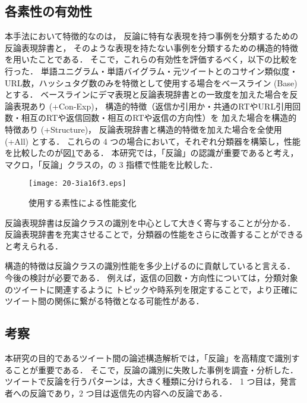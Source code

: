 \documentclass[japanese]{jnlp_1.4}
\newcommand{\addspan}[1]{}
\begin{document}
\subsection{各素性の有効性}

本手法において特徴的なのは，
反論に特有な表現を持つ事例を分類するための反論表現辞書と，
そのような表現を持たない事例を分類するための構造的特徴を用いたことである．
そこで，これらの有効性を評価するべく，以下の比較を行った．
単語ユニグラム・単語バイグラム・元ツイートとのコサイン類似度・
URL数，ハッシュタグ数のみを特徴として使用する場合をベースライン (Base) とする．
ベースラインにデマ表現と反論表現辞書との一致度を加えた場合を反論表現あり (+Con-Exp)，
構造的特徴（返信か引用か・共通のRTやURL引用回数・相互のRTや返信回数・相互のRTや返信の方向性）を
加えた場合を構造的特徴あり (+Structure)，
反論表現辞書と構造的特徴を加えた場合を全使用 (+All) とする．
これらの 4 つの場合において，それぞれ分類器を構築し，性能を比較したのが図\ref{fig:使用する素性による性能変化}である．
本研究では，「反論」の認識が重要であると考え，
マクロ\addspan{$F_1$値}，「反論」クラスの\addspan{$F_1$値}，\addspan{正答率}の 3 指標で性能を比較した．

\begin{figure}[b]
  \begin{center}
   \texttt{[image: 20-3ia16f3.eps]}
  \end{center}
  \caption{使用する素性による性能変化}
  \label{fig:使用する素性による性能変化}
\end{figure}

\addspan{まず，Baseに対する+Con-Exp，および+Structureに対する+Allの性能から，}
反論表現辞書は反論クラスの識別を中心として大きく寄与することが分かる．
反論表現辞書を充実させることで，分類器の性能をさらに改善することができると考えられる．
\addspan{次に，Baseに対する+Structure，および+Con-Expに対する+Allの性能について，
それぞれ「反論」$F_1$値が向上していることから，}
構造的特徴は反論クラスの識別性能を多少上げるのに貢献していると言える．
\addspan{一方で他クラスの識別の失敗例が増えることにより全体の正答率はやや低下しており，}今後の検討が必要である．
例えば，返信の回数・方向性については，分類対象のツイートに関連するように
トピックや時系列を限定することで，より正確にツイート間の関係に繋がる特徴となる可能性がある．


\subsection{考察}

本研究の目的であるツイート間の論述構造解析では，「反論」を高精度で識別することが重要である．
そこで，反論の識別に失敗した事例を調査・分析した．
ツイートで反論を行うパターンは，大きく\addspan{3}種類に分けられる．
1 つ目は，発言者への反論であり，2 つ目は返信先の内容への反論である．
\addspan{そして 3 つ目は，発言者と返信先の内容の両方に対する，いわば複合的な反論である．
これら 3 種類の反論の例を以下に示す．}
\end{document}
